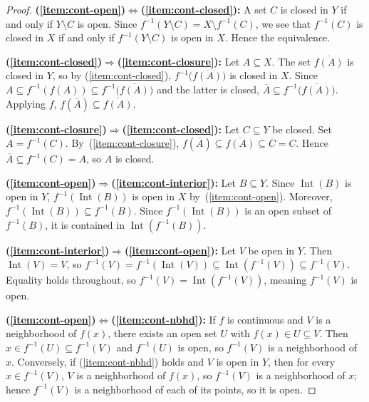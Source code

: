 \documentclass[11pt,a4paper,twoside]{book}
\theoremstyle{remark}
\theoremstyle{definition}
\theoremstyle{definition}
\begin{document}
\begin{proof}
\textbf{(\ref{item:cont-open})$\Leftrightarrow$(\ref{item:cont-closed}):}\;
A set $C$ is closed in $Y$ if and only if $Y\setminus C$ is open.  Since
$f^{-1}(Y\setminus C)=X\setminus f^{-1}(C)$, we see that $f^{-1}(C)$ is
closed in $X$ if and only if $f^{-1}(Y\setminus C)$ is open in $X$.  Hence the
equivalence.

\medskip\noindent
\textbf{(\ref{item:cont-closed})$\Rightarrow$(\ref{item:cont-closure}):}\;
Let $A\subseteq X$.  The set $\overline{f(A)}$ is closed in $Y$, so by
(\ref{item:cont-closed}), $f^{-1}\bigl(\overline{f(A)}\bigr)$ is closed in
$X$.  Since $A\subseteq f^{-1}(f(A))\subseteq
f^{-1}\bigl(\overline{f(A)}\bigr)$ and the latter is closed,
$\overline{A}\subseteq f^{-1}\bigl(\overline{f(A)}\bigr)$.  Applying $f$,
$f(\overline{A})\subseteq\overline{f(A)}$.

\medskip\noindent
\textbf{(\ref{item:cont-closure})$\Rightarrow$(\ref{item:cont-closed}):}\;
Let $C\subseteq Y$ be closed.  Set $A=f^{-1}(C)$.  By~(\ref{item:cont-closure}),
$f(\overline{A})\subseteq\overline{f(A)}\subseteq\overline{C}=C$.  Hence
$\overline{A}\subseteq f^{-1}(C)=A$, so $A$ is closed.

\medskip\noindent
\textbf{(\ref{item:cont-open})$\Rightarrow$(\ref{item:cont-interior}):}\;
Let $B\subseteq Y$.  Since $\operatorname{Int}(B)$ is open in $Y$,
$f^{-1}(\operatorname{Int}(B))$ is open in $X$ by~(\ref{item:cont-open}).
Moreover, $f^{-1}(\operatorname{Int}(B))\subseteq f^{-1}(B)$.  Since
$f^{-1}(\operatorname{Int}(B))$ is an open subset of $f^{-1}(B)$, it is
contained in $\operatorname{Int}(f^{-1}(B))$.

\medskip\noindent
\textbf{(\ref{item:cont-interior})$\Rightarrow$(\ref{item:cont-open}):}\;
Let $V$ be open in $Y$.  Then $\operatorname{Int}(V)=V$, so
$f^{-1}(V)=f^{-1}(\operatorname{Int}(V))\subseteq
\operatorname{Int}(f^{-1}(V))\subseteq f^{-1}(V)$.  Equality holds throughout,
so $f^{-1}(V)=\operatorname{Int}(f^{-1}(V))$, meaning $f^{-1}(V)$ is open.

\medskip\noindent
\textbf{(\ref{item:cont-open})$\Leftrightarrow$(\ref{item:cont-nbhd}):}\;
If $f$ is continuous and $V$ is a neighborhood of $f(x)$, there exists an open
set $U$ with $f(x)\in U\subseteq V$.  Then $x\in f^{-1}(U)\subseteq f^{-1}(V)$
and $f^{-1}(U)$ is open, so $f^{-1}(V)$ is a neighborhood of $x$.  Conversely,
if (\ref{item:cont-nbhd}) holds and $V$ is open in $Y$, then for every
$x\in f^{-1}(V)$, $V$ is a neighborhood of $f(x)$, so $f^{-1}(V)$ is a
neighborhood of $x$; hence $f^{-1}(V)$ is a neighborhood of each of its points,
so it is open.
\end{proof}
\end{document}
